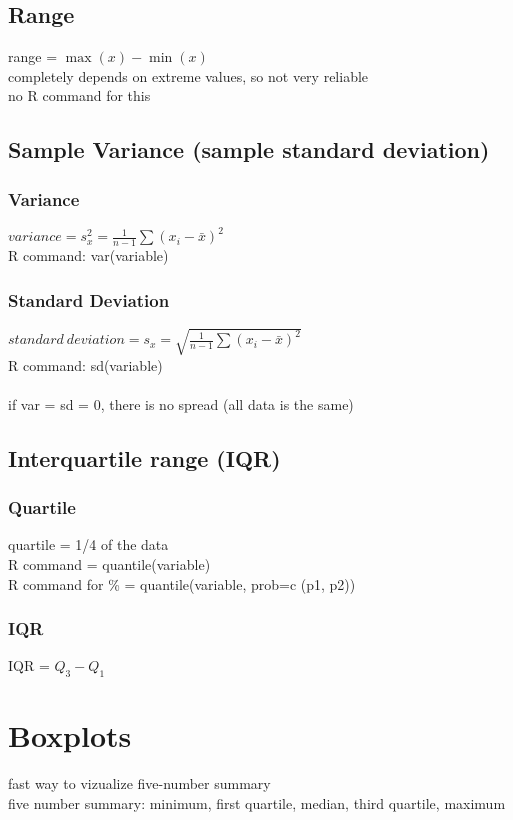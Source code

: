 \documentclass{report}
\begin{document}
        \subsection{Range}
        range = $\max(x)-\min(x)$\\
        completely depends on extreme values, so not very reliable\\
        no R command for this

        \subsection{Sample Variance (sample standard deviation)}
            \subsubsection{Variance}
            $variance=s^2_x=\frac{1}{n-1}\sum(x_i-\bar{x})^2$\\
            R command: var(variable)

            \subsubsection{Standard Deviation}
            $standard\ deviation=s_x=\sqrt{\frac{1}{n-1}\sum(x_i-\bar{x})^2}$\\
            R command: sd(variable)\\\\
            if var = sd = 0, there is no spread (all data is the same)

	\subsection{Interquartile range (IQR)}
        \subsubsection{Quartile}
        quartile = 1/4 of the data\\
        R command = quantile(variable)\\
        R command for \% = quantile(variable, prob=c (p1, p2)) 

        \subsubsection{IQR}
        IQR = $Q_3-Q_1$\\

    \section{Boxplots}
    fast way to vizualize five-number summary\\
    five number summary: minimum, first quartile, median, third quartile, maximum
\end{document}
